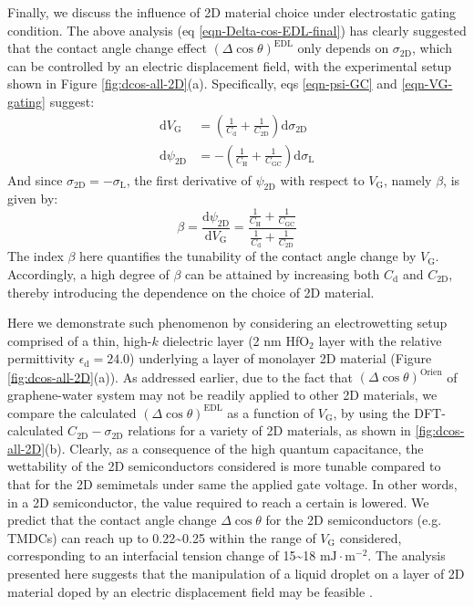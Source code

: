 Finally, we discuss the influence of 2D material choice under
electrostatic gating condition. The above analysis (eq
\ref{eqn-Delta-cos-EDL-final}) has clearly suggested that the contact
angle change effect \((\Delta \cos \theta)^{\mathrm{EDL}}\) only depends
on \(\sigma_{\mathrm{2D}}\), which can be controlled by an electric
displacement field, with the experimental setup shown in Figure
\ref{fig:dcos-all-2D}(a). Specifically,  eqs \ref{eqn-psi-GC} and
\ref{eqn-VG-gating} suggest:
\begin{equation}
\label{eqn-dVG-choice-2D}
\begin{aligned}
\mathrm{d} V_{\mathrm{G}} &= (\frac{1}{C_{\mathrm{d}}} + \frac{1}{C_{\mathrm{2D}}}) \mathrm{d} \sigma_{\mathrm{2D}} \\
\mathrm{d} \psi_{\mathrm{2D}} &= -(\frac{1}{C_{\mathrm{H}}} + \frac{1}{C_{\mathrm{GC}}}) \mathrm{d} \sigma_{\mathrm{L}}
\end{aligned}
\end{equation}
And since \(\sigma_{\mathrm{2D}} = -\sigma_{\mathrm{L}}\), the first
derivative of \(\psi_{\mathrm{2D}}\) with respect to \(V_{\mathrm{G}}\), namely \(\beta\), is given by:
\begin{equation}
\label{eqn-def-beta}
\beta = \frac{\mathrm{d} \psi_{\mathrm{2D}}}{\mathrm{d} V_{\mathrm{G}}} 
      = \frac{\frac{1}{C_{\mathrm{H}}} + \frac{1}{C_{\mathrm{GC}}}}{\frac{1}{C_{\mathrm{d}}} + \frac{1}{C_{\mathrm{2D}}}}
\end{equation}
The index \(\beta\) here quantifies the tunability of the contact angle change
by \(V_{\mathrm{G}}\). Accordingly, a high degree of \(\beta\) can be attained by increasing both \(C_{\mathrm{d}}\) and
\(C_{\mathrm{2D}}\), thereby introducing the dependence on the choice of 2D material.

Here we demonstrate such phenomenon by considering an electrowetting
setup comprised of a thin, high-\(k\) dielectric layer (2 nm
HfO\(_{\text{2}}\) layer with the relative permittivity
\(\epsilon_{\mathrm{d}}=24.0\)) underlying a layer of monolayer 2D
material (Figure \ref{fig:dcos-all-2D}(a)).  As addressed earlier, due
to the fact that \((\Delta \cos \theta)^{\mathrm{Orien}}\) of
graphene-water system may not be readily applied to other 2D
materials, we compare the calculated
\((\Delta \cos \theta)^{\mathrm{EDL}}\) as a function of
\(V_{\mathrm{G}}\), by using the DFT-calculated
\(C_{\mathrm{2D}} - \sigma_{\mathrm{2D}}\) relations for a variety of
2D materials, as shown in \ref{fig:dcos-all-2D}(b). Clearly, as a
consequence of the high quantum capacitance, the wettability of the 2D
semiconductors considered is more tunable compared to that for the 2D
semimetals under same the applied gate voltage. In other words, in a 2D
semiconductor, the value required to reach a certain is lowered. We
predict that the contact angle change \(\Delta \cos \theta\) for the
2D semiconductors (e.g. TMDCs) can reach up to
0.22\textasciitilde{}0.25 within the range of \(V_{\mathrm{G}}\)
considered, corresponding to an interfacial tension change of
15\textasciitilde{}18 \(\mathrm{mJ} \cdot \mathrm{m}^{-2}\). The
analysis presented here suggests that the manipulation of a liquid
droplet on a layer of 2D material doped by an electric displacement
field may be feasible \cite{Mugele_2005,Hayes_2003_nature_EWOD}.

